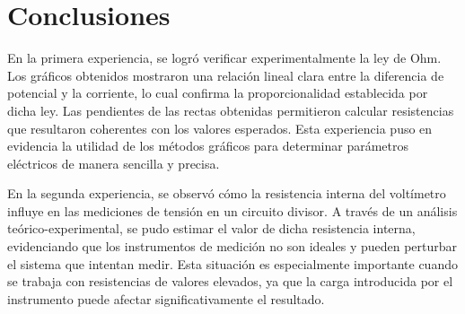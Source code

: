 \documentclass[11pt]{article}
\begin{document}
\section*{Conclusiones}



En la primera experiencia, se logró verificar experimentalmente la ley de Ohm. Los gráficos obtenidos mostraron una relación lineal clara entre la diferencia de potencial y la corriente, lo cual confirma la proporcionalidad establecida por dicha ley. Las pendientes de las rectas obtenidas permitieron calcular resistencias que resultaron coherentes con los valores esperados. Esta experiencia puso en evidencia la utilidad de los métodos gráficos para determinar parámetros eléctricos de manera sencilla y precisa.

En la segunda experiencia, se observó cómo la resistencia interna del voltímetro influye en las mediciones de tensión en un circuito divisor. A través de un análisis teórico-experimental, se pudo estimar el valor de dicha resistencia interna, evidenciando que los instrumentos de medición no son ideales y pueden perturbar el sistema que intentan medir. Esta situación es especialmente importante cuando se trabaja con resistencias de valores elevados, ya que la carga introducida por el instrumento puede afectar significativamente el resultado.
\end{document}
